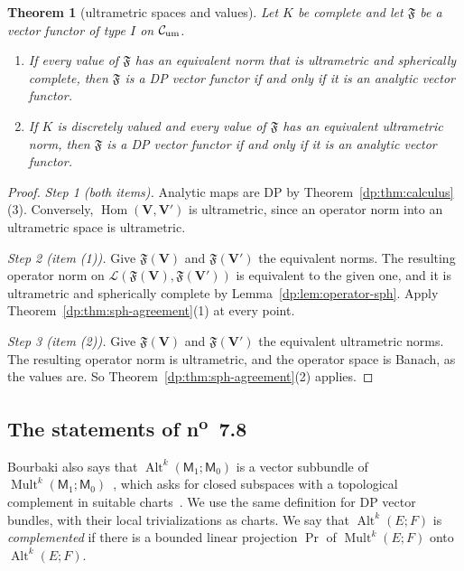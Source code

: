 \documentclass[11pt]{amsart}
\newtheorem{theorem}{Theorem}[section]
\theoremstyle{definition}
\theoremstyle{remark}
\numberwithin{equation}{section}
\newcommand{\cL}{\mathcal L}
\newcommand{\Alt}{\operatorname{Alt}}
\newcommand{\Mult}{\operatorname{Mult}}
\newcommand{\cC}{\mathcal{C}}
\theoremstyle{plain}
\theoremstyle{definition}
\theoremstyle{plain}
\begin{document}
\begin{theorem}[ultrametric spaces and values]\label{dp:thm:functors-um}
Let $K$ be complete and let $\mathfrak F$ be a vector functor of type $I$ on $\cC_{\rm um}$.
\begin{enumerate}
\item If every value of $\mathfrak F$ has an equivalent norm that is ultrametric and spherically complete, then $\mathfrak F$ is a DP vector functor if and only if it is an analytic vector functor.
\item If $K$ is discretely valued and every value of $\mathfrak F$ has an equivalent ultrametric norm, then $\mathfrak F$ is a DP vector functor if and only if it is an analytic vector functor.
\end{enumerate}
\end{theorem}

\begin{proof}
\emph{Step 1 (both items).} Analytic maps are DP by Theorem~\ref{dp:thm:calculus}(3). Conversely, $\operatorname{Hom}(\mathbf V,\mathbf V')$ is ultrametric, since an operator norm into an ultrametric space is ultrametric.

\emph{Step 2 (item (1)).} Give $\mathfrak F(\mathbf V)$ and $\mathfrak F(\mathbf V')$ the equivalent norms. The resulting operator norm on $\cL(\mathfrak F(\mathbf V),\mathfrak F(\mathbf V'))$ is equivalent to the given one, and it is ultrametric and spherically complete by Lemma~\ref{dp:lem:operator-sph}. Apply Theorem~\ref{dp:thm:sph-agreement}(1) at every point.

\emph{Step 3 (item (2)).} Give $\mathfrak F(\mathbf V)$ and $\mathfrak F(\mathbf V')$ the equivalent ultrametric norms. The resulting operator norm is ultrametric, and the operator space is Banach, as the values are. So Theorem~\ref{dp:thm:sph-agreement}(2) applies.
\end{proof}

\subsection{The statements of \texorpdfstring{n\textsuperscript{o}~7.8}{no. 7.8}}

Bourbaki also says that $\Alt^k(\mathsf M_1;\mathsf M_0)$ is a vector subbundle of $\Mult^k(\mathsf M_1;\mathsf M_0)$~\cite[n\textsuperscript{o}~7.8.1]{Bou}, which asks for closed subspaces with a topological complement in suitable charts~\cite[n\textsuperscript{o}~7.5.1]{Bou}. We use the same definition for DP vector bundles, with their local trivializations as charts. We say that $\Alt^k(E;F)$ is \emph{complemented} if there is a bounded linear projection $\operatorname{Pr}$ of $\Mult^k(E;F)$ onto $\Alt^k(E;F)$.
\end{document}
